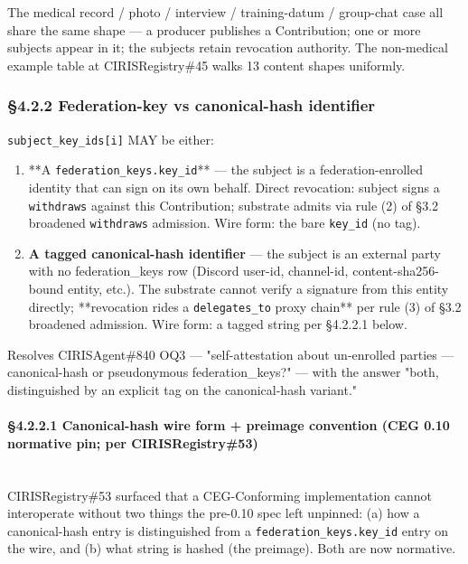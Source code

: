 \documentclass[10pt]{article}
\begin{document}
The medical record / photo / interview / training-datum / group-chat case all share the same shape — a producer publishes a Contribution; one or more subjects appear in it; the subjects retain revocation authority. The non-medical example table at CIRISRegistry\#45 walks 13 content shapes uniformly.


\subsubsection*{§4.2.2 Federation-key vs canonical-hash identifier}


\texttt{subject\_key\_ids[i]} MAY be either:


\begin{enumerate}\setlength\itemsep{0pt}
\item **A \texttt{federation\_keys.key\_id}** — the subject is a federation-enrolled identity that can sign on its own behalf. Direct revocation: subject signs a \texttt{withdraws} against this Contribution; substrate admits via rule (2) of §3.2 broadened \texttt{withdraws} admission. Wire form: the bare \texttt{key\_id} (no tag).
\item \textbf{A tagged canonical-hash identifier} — the subject is an external party with no federation\_keys row (Discord user-id, channel-id, content-sha256-bound entity, etc.). The substrate cannot verify a signature from this entity directly; **revocation rides a \texttt{delegates\_to} proxy chain** per rule (3) of §3.2 broadened admission. Wire form: a tagged string per §4.2.2.1 below.
\end{enumerate}


Resolves CIRISAgent\#840 OQ3 — "self-attestation about un-enrolled parties — canonical-hash or pseudonymous federation\_keys?" — with the answer "both, distinguished by an explicit tag on the canonical-hash variant."


\paragraph{§4.2.2.1 Canonical-hash wire form + preimage convention (CEG 0.10 normative pin; per CIRISRegistry\#53)}\mbox{}\\


CIRISRegistry\#53 surfaced that a CEG-Conforming implementation cannot interoperate without two things the pre-0.10 spec left unpinned: (a) how a canonical-hash entry is distinguished from a \texttt{federation\_keys.key\_id} entry on the wire, and (b) what string is hashed (the preimage). Both are now normative.
\end{document}
